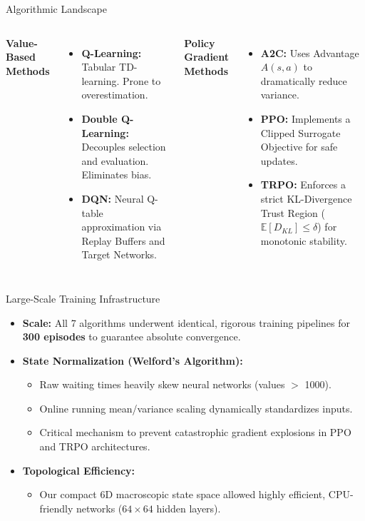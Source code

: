 \documentclass[aspectratio=169]{beamer}
\begin{document}
\begin{frame}{Algorithmic Landscape}
  \begin{columns}[T]
    \textbf{Value-Based Methods}
    \begin{itemize}
      \item \textbf{Q-Learning:} Tabular TD-learning. Prone to overestimation.
      \item \textbf{Double Q-Learning:} Decouples selection and evaluation. Eliminates bias.
      \item \textbf{DQN:} Neural Q-table approximation via Replay Buffers and Target Networks.
    \end{itemize}
    
    \textbf{Policy Gradient Methods}
    \begin{itemize}
      \item \textbf{A2C:} Uses Advantage $A(s,a)$ to dramatically reduce variance.
      \item \textbf{PPO:} Implements a Clipped Surrogate Objective for safe updates.
      \item \textbf{TRPO:} Enforces a strict KL-Divergence Trust Region ($\mathbb{E}[ D_{KL} ] \le \delta$) for monotonic stability.
    \end{itemize}
  \end{columns}
\end{frame}

\begin{frame}{Large-Scale Training Infrastructure}
  \begin{itemize}
    \item \textbf{Scale:} All 7 algorithms underwent identical, rigorous training pipelines for \textbf{300 episodes} to guarantee absolute convergence.
    \vspace{0.4cm}
    \item \textbf{State Normalization (Welford's Algorithm):}
    \begin{itemize}
        \item Raw waiting times heavily skew neural networks (values $>$ 1000).
        \item Online running mean/variance scaling dynamically standardizes inputs.
        \item \textcolor{SoftGold}{Critical mechanism} to prevent catastrophic gradient explosions in PPO and TRPO architectures.
    \end{itemize}
    \vspace{0.4cm}
    \item \textbf{Topological Efficiency:} 
    \begin{itemize}
        \item Our compact 6D macroscopic state space allowed highly efficient, CPU-friendly networks ($64 \times 64$ hidden layers).
    \end{itemize}
  \end{itemize}
\end{frame}
\end{document}
